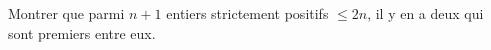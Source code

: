 Montrer que parmi $n + 1$ entiers strictement positifs $\leq 2n$, il y en a deux qui sont premiers entre eux.
